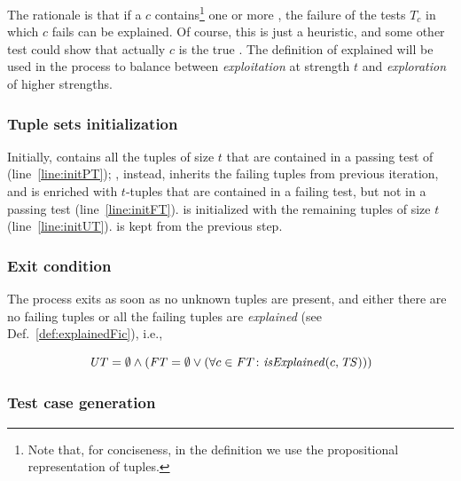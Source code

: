 \begin{tikzborder}{\cite{Gargantini16:validation}}
\begin{tikzborder}{\cite{gargantini_combinatorial_2017}}
\begin{tikzborder}{\cite{gargantini_combinatorial_2017}}
\begin{tikzborder}{\cite{garn2019}}
\begin{tikzborder}{\cite{arcaini2019achieving}}
\begin{tikzborder}{}
The rationale is that if a \fic $c$ contains\footnote{Note that, for conciseness, in the definition we use the propositional representation of tuples.} one or more \isoMfics, the failure of the tests $T_c$ in which $c$ fails can be explained. Of course, this is just a heuristic, and some other test could show that actually $c$ is the true \mfic. The definition of explained \fic will be used in the process to balance between {\it exploitation} at strength $t$ and {\it exploration} of higher strengths.
\end{tikzborder}

\subsubsection{Tuple sets initialization}

\begin{tikzborder}{}
Initially, \pt contains all the tuples of size $t$ that are contained in a passing test of \ts (line~\ref{line:initPT}); \ft, instead, inherits the failing tuples from previous iteration, and is enriched with $t$-tuples that are contained in a failing test, but not in a passing test (line~\ref{line:initFT}). \ut is initialized with the remaining tuples of size $t$ (line~\ref{line:initUT}). \isoMficsSet is kept from the previous step.
\end{tikzborder}

\subsubsection{Exit condition}\label{sec:exitCondition}

\begin{tikzborder}{}	
The process exits as soon as no unknown tuples \ut are present, and either there are no failing tuples or all the failing tuples are {\it explained} (see Def.~\ref{def:explainedFic}), i.e.,
\end{tikzborder}
%
\begin{equation}\label{eq:exitCond}
\mathit{UT} = \emptyset \wedge (\mathit{FT}=\emptyset \vee (\forall c \in \mathit{FT} \colon \mathit{isExplained}(c, \mathit{TS})))
\end{equation}

\subsubsection{Test case generation}\label{sec:testGeneration}


\end{tikzborder}
\end{tikzborder}
\end{tikzborder}
\end{tikzborder}
\end{tikzborder}
